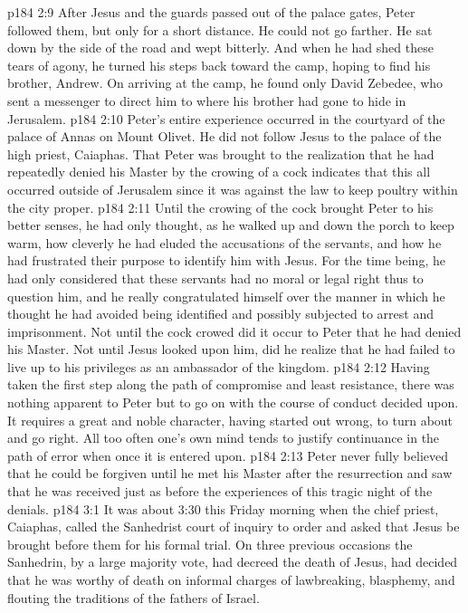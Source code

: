 \vs p184 2:9 After Jesus and the guards passed out of the palace gates, Peter followed them, but only for a short distance. He could not go farther. He sat down by the side of the road and wept bitterly. And when he had shed these tears of agony, he turned his steps back toward the camp, hoping to find his brother, Andrew. On arriving at the camp, he found only David Zebedee, who sent a messenger to direct him to where his brother had gone to hide in Jerusalem.
\vs p184 2:10 \pc Peter’s entire experience occurred in the courtyard of the palace of Annas on Mount Olivet. He did not follow Jesus to the palace of the high priest, Caiaphas. That Peter was brought to the realization that he had repeatedly denied his Master by the crowing of a cock indicates that this all occurred outside of Jerusalem since it was against the law to keep poultry within the city proper.
\vs p184 2:11 \pc Until the crowing of the cock brought Peter to his better senses, he had only thought, as he walked up and down the porch to keep warm, how cleverly he had eluded the accusations of the servants, and how he had frustrated their purpose to identify him with Jesus. For the time being, he had only considered that these servants had no moral or legal right thus to question him, and he really congratulated himself over the manner in which he thought he had avoided being identified and possibly subjected to arrest and imprisonment. Not until the cock crowed did it occur to Peter that he had denied his Master. Not until Jesus looked upon him, did he realize that he had failed to live up to his privileges as an ambassador of the kingdom.
\vs p184 2:12 Having taken the first step along the path of compromise and least resistance, there was nothing apparent to Peter but to go on with the course of conduct decided upon. It requires a great and noble character, having started out wrong, to turn about and go right. All too often one’s own mind tends to justify continuance in the path of error when once it is entered upon.
\vs p184 2:13 Peter never fully believed that he could be forgiven until he met his Master after the resurrection and saw that he was received just as before the experiences of this tragic night of the denials.
\vs p184 3:1 It was about 3:30 this Friday morning when the chief priest, Caiaphas, called the Sanhedrist court of inquiry to order and asked that Jesus be brought before them for his formal trial. On three previous occasions the Sanhedrin, by a large majority vote, had decreed the death of Jesus, had decided that he was worthy of death on informal charges of lawbreaking, blasphemy, and flouting the traditions of the fathers of Israel.
